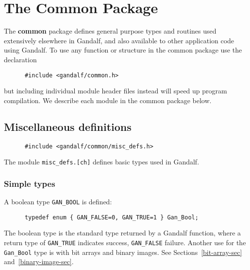 \chapter{The Common Package} \label{common-chapter}
The {\bf common} package defines general purpose types and routines used
extensively elsewhere in Gandalf, and also available to other application
code using Gandalf. To use any function or structure in the common package
use the declaration
\begin{verbatim}
      #include <gandalf/common.h>
\end{verbatim}
but including individual module header files instead will speed up program
compilation.
We describe each module in the common package below.

\section{Miscellaneous definitions} \label{common-misc-sec}
\begin{verbatim}
      #include <gandalf/common/misc_defs.h>
\end{verbatim}
The module {\tt misc\_defs.[ch]} defines basic types used in Gandalf.

\subsection{Simple types} \label{simple-types-sec}
A boolean type {\tt GAN\_BOOL} is defined:
\begin{verbatim}
      typedef enum { GAN_FALSE=0, GAN_TRUE=1 } Gan_Bool;
\end{verbatim}
The boolean type is the standard type returned by a Gandalf function,
where a return type of {\tt GAN\_TRUE} indicates success, {\tt GAN\_FALSE}
failure. Another use for the {\tt Gan\_Bool} type is with bit arrays and
binary images. See Sections~\ref{bit-array-sec} and~\ref{binary-image-sec}.

